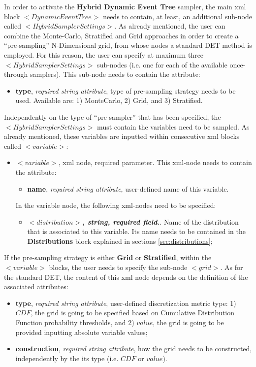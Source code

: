 In order to activate the \textbf{Hybrid Dynamic Event Tree}  sampler, the main xml block $<DynamicEventTree>$ needs to contain, at least, an additional sub-node called $<HybridSamplerSettings>$. As already mentioned, the user can combine the Monte-Carlo, Stratified and Grid approaches in order to create a ``pre-sampling'' N-Dimensional grid, from whose nodes a standard DET method is employed. For this reason, the user can specify at maximum three $<HybridSamplerSettings>$ sub-nodes (i.e. one for each of the available once-through samplers). 
 This sub-node needs to contain the attribute:
\begin{itemize}
  \item \textbf{type}, \textit{required string attribute}, type of pre-sampling strategy needs to be used. Available are: 1) MonteCarlo, 2) Grid, and 3) Stratified. 
 \end{itemize}
Independently on the type of ``pre-sampler'' that has been specified, the $<HybridSamplerSettings>$  must contain the  variables need to be sampled. As already mentioned, these variables are inputted within consecutive xml blocks called $<variable>$:
\begin{itemize}
\item $<variable>$, xml node, required parameter. This xml-node needs to contain the attribute:
\begin{itemize}
  \item \textbf{name}, \textit{required string attribute}, user-defined name of this variable. 
 \end{itemize}
 In the variable node, the following xml-nodes need to be specified:
 \begin{itemize}
    \item $<distribution>$\textbf{\textit{, string, required field.}}. Name of the distribution that is associated to this variable. Its name needs to be contained in the \textbf{Distributions} block explained in sections \ref{sec:distributions};
  \end{itemize}
 \end{itemize}
If the pre-sampling strategy is either \textbf{Grid} or \textbf{Stratified}, within the $<variable>$ blocks, the user needs to specify the sub-node $<grid>$. As for the standard DET, the content of this xml node depends on the definition of the associated attributes:
\begin{itemize}
\itemsep0em
\item \textbf{type}, \textit{required string attribute}, user-defined discretization metric type: 1) $CDF$, the grid is going to be specified based on  Cumulative Distribution Function probability thresholds, and 2) $value$, the grid is going to be provided inputting absolute variable values;
\item \textbf{construction}, \textit{required string attribute}, how the grid needs to be constructed, independently by the its type (i.e. $CDF$ or $value$). 
\end{itemize}
